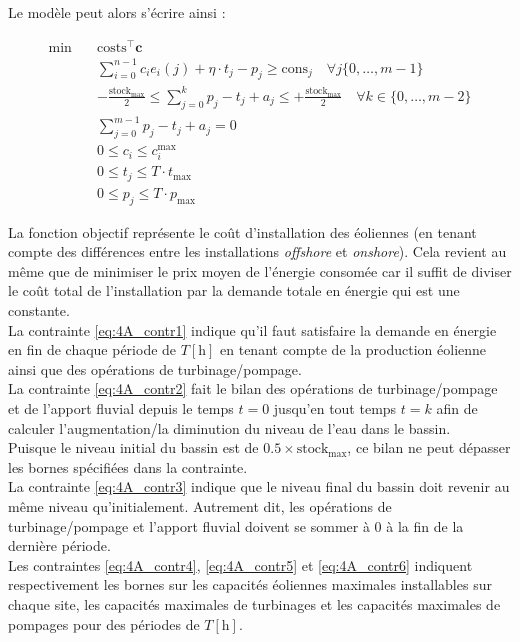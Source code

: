 \documentclass{article}
\newcommand{\unit}[1]{[\mathrm{#1}]}
\begin{document}
\noindent
Le modèle peut alors s'écrire ainsi :

\begin{align}
    \min \quad &\mathrm{costs}^\intercal\mathbf{c} \nonumber\\
    & \sum_{i=0}^{n-1} c_i e_i(j) + \eta \cdot t_j - p_j \ge \mathrm{cons}_j \quad \forall j \{ 0, \ldots, m-1 \}\label{eq:4A_contr1}\\
    & -\frac{\mathrm{stock}_\mathrm{max}}{2} \le \sum_{j=0}^{k} p_j - t_j + a_j \le  +\frac{\mathrm{stock}_\mathrm{max}}{2} \quad \forall k \in \{ 0, \ldots, m-2 \}\label{eq:4A_contr2}\\
    & \sum_{j=0}^{m-1} p_j - t_j + a_j = 0 \label{eq:4A_contr3}\\
    & 0 \le c_i \le c_i^\mathrm{max} \label{eq:4A_contr4}\\
    & 0 \le t_j \le T \cdot t_\mathrm{max} \label{eq:4A_contr5}\\
    & 0 \le p_j \le T \cdot p_\mathrm{max} \label{eq:4A_contr6}
\end{align}

\newpage

La fonction objectif représente le coût d'installation des éoliennes (en tenant compte des différences entre les installations \textit{offshore} et \textit{onshore}). 
Cela revient au même que de minimiser le prix moyen de l'énergie consomée car il suffit de diviser le coût total de l'installation par la demande totale en énergie qui est une constante.\\
La contrainte \eqref{eq:4A_contr1} indique qu'il faut satisfaire la demande en énergie en fin de chaque période de $T \unit{h}$ en tenant compte de la production éolienne
ainsi que des opérations de turbinage/pompage.\\
La contrainte \eqref{eq:4A_contr2} fait le bilan des opérations de turbinage/pompage et de l'apport fluvial depuis le temps $t = 0$ jusqu'en tout temps $t = k$ afin de calculer l'augmentation/la diminution du niveau de l'eau dans le bassin.\\
Puisque le niveau initial du bassin est de $0.5 \times \mathrm{stock}_\mathrm{max}$, ce bilan ne peut dépasser les bornes spécifiées dans la contrainte.\\
La contrainte \eqref{eq:4A_contr3} indique que le niveau final du bassin doit revenir au même niveau qu'initialement. Autrement dit, les opérations de turbinage/pompage et l'apport fluvial doivent se sommer à 0 à la fin de la dernière période.\\
Les contraintes \eqref{eq:4A_contr4}, \eqref{eq:4A_contr5} et \eqref{eq:4A_contr6} indiquent respectivement les bornes sur les capacités éoliennes maximales installables sur chaque site, 
les capacités maximales de turbinages et les capacités maximales de pompages pour des périodes de $T \unit{h}$.
\end{document}
